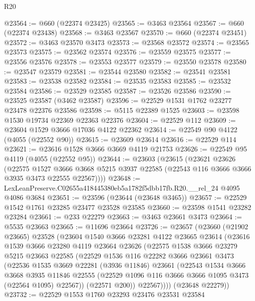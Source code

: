 \begin{lexlean}{R20}
\begin{coremodule}
@23564 := @660 (@22374 @23425)
@23565 := @3463 @23564
@23567 := @660 (@22374 @23438)
@23568 := @3463 @23567
@23570 := @660 (@22374 @23451)
@23572 := @3463 @23570 @3473
@23573 := @23568 @23572
@23574 := @23565 @23573
@23575 := @23562 @23574
@23576 := @23559 @23575
@23577 := @23556 @23576
@23578 := @23553 @23577
@23579 := @23550 @23578
@23580 := @23547 @23579
@23581 := @23544 @23580
@23582 := @23541 @23581
@23583 := @23538 @23582
@23584 := @23535 @23583
@23585 := @23532 @23584
@23586 := @23529 @23585
@23587 := @23526 @23586
@23590 := @23525 @23587 (@3462 @23587)
@23596 := @22529 @1531 @1762 @23277 @23478 @22376 @23586
@23598 := @5115 @22389 @1525
@23603 := @23598 @1530 @19734 @22369 @22363 @22376
@23604 := @22529 @112
@23609 := @23604 @1529 @3666 @17036 @4122 @22362
@23614 := @22549 @90 @4122 (@4055 (@22552 @90))
@23615 := @23609 @23614
@23616 := @22529 @114
@23621 := @23616 @1528 @3666 @3669 @4119 @21753
@23626 := @22549 @95 @4119 (@4055 (@22552 @95))
@23644 := @23603
    (@23615
      (@23621
        @23626
        (@22575
          @1527
          @3666
          @3668
          @5215
          @3937
          @22585
          (@22543 @116 @3666 @3666 @3935 @3473 @22555 @22567))))
@23648 := LexLeanPreserve.C02655a418445380eb5a1782f5dbb17fb.R20.__rel_24 @4095 @4086 @3684
@23651 := @23596 (@23644 (@23648 @3465))
@23657 := @22529 @1542 @1761 @23285 @23477 @23528 @23585
@23660 := @23598 @1541 @23282 @23284
@23661 := @233 @22279
@23663 := @3463 @23661 @3473
@23664 := @5535 @23663
@23665 := @11696 @23664
@23726 := @23657
    (@23660
      (@21902 @23665)
      @23528
      (@23604
        @1540
        @3666
        @23281
        @4122
        @23665
        @23614
        (@23616
          @1539
          @3666
          @23280
          @4119
          @23664
          @23626
          (@22575
            @1538
            @3666
            @23279
            @5215
            @23663
            @22585
            (@22529
              @1536
              @116
              @22282
              @3666
              @23661
              @3473
              (@22536
                @1535
                @3669
                @22281
                (@3936 @11846)
                @23661
                (@22543
                  @1534
                  @3666
                  @3668
                  @3935
                  @11846
                  @22555
                  (@22529 @1096 @116 @3666 @3666 @1095 @3473 (@22564 @1095) @22567))
                (@22571 @200))
              @22567))))
      (@23648 @22279))
@23732 := @22529 @1553 @1760 @23293 @23476 @23531 @23584

\end{coremodule}
\end{lexlean}
